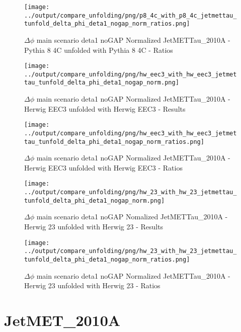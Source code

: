\documentclass[11pt]{book}
\begin{document}
\begin{figure}[ht]
\centering
\texttt{[image: ../output/compare\_unfolding/png/p8\_4c\_with\_p8\_4c\_jetmettau\_tunfold\_delta\_phi\_deta1\_nogap\_norm\_ratios.png]}
\caption{$\Delta\phi$ main scenario deta1 noGAP Normalized JetMETTau\_2010A - Pythia 8 4C unfolded with Pythia 8 4C - Ratios}
\label{p8_p8_jetmettau_tunfold_delta_phi_deta1_nogap_norm_b}
\end{figure}

\begin{figure}[ht]
\centering
\texttt{[image: ../output/compare\_unfolding/png/hw\_eec3\_with\_hw\_eec3\_jetmettau\_tunfold\_delta\_phi\_deta1\_nogap\_norm.png]}
\caption{$\Delta\phi$ main scenario deta1 noGAP Normalized JetMETTau\_2010A - Herwig EEC3 unfolded with Herwig EEC3 - Results}
\label{hw_eec3_hw_eec3_jetmettau_tunfold_delta_phi_deta1_nogap_norm_a}
\end{figure}

\begin{figure}[ht]
\centering
\texttt{[image: ../output/compare\_unfolding/png/hw\_eec3\_with\_hw\_eec3\_jetmettau\_tunfold\_delta\_phi\_deta1\_nogap\_norm\_ratios.png]}
\caption{$\Delta\phi$ main scenario deta1 noGAP Normalized JetMETTau\_2010A - Herwig EEC3 unfolded with Herwig EEC3 - Ratios}
\label{hw_eec3_hw_eec3_jetmettau_tunfold_delta_phi_deta1_nogap_norm_b}
\end{figure}

\begin{figure}[ht]
\centering
\texttt{[image: ../output/compare\_unfolding/png/hw\_23\_with\_hw\_23\_jetmettau\_tunfold\_delta\_phi\_deta1\_nogap\_norm.png]}
\caption{$\Delta\phi$ main scenario deta1 noGAP Nomalized JetMETTau\_2010A - Herwig 23 unfolded with Herwig 23 - Results}
\label{hw_23_hw_23_jetmettau_tunfold_delta_phi_deta1_nogap_norm_a}
\end{figure}

\begin{figure}[ht]
\centering
\texttt{[image: ../output/compare\_unfolding/png/hw\_23\_with\_hw\_23\_jetmettau\_tunfold\_delta\_phi\_deta1\_nogap\_norm\_ratios.png]}
\caption{$\Delta\phi$ main scenario deta1 noGAP Normalized JetMETTau\_2010A - Herwig 23 unfolded with Herwig 23 - Ratios}
\label{hw_23_hw_23_jetmettau_tunfold_delta_phi_deta1_nogap_norm_b}
\end{figure}


\clearpage
\section{JetMET\_2010A}
\end{document}
